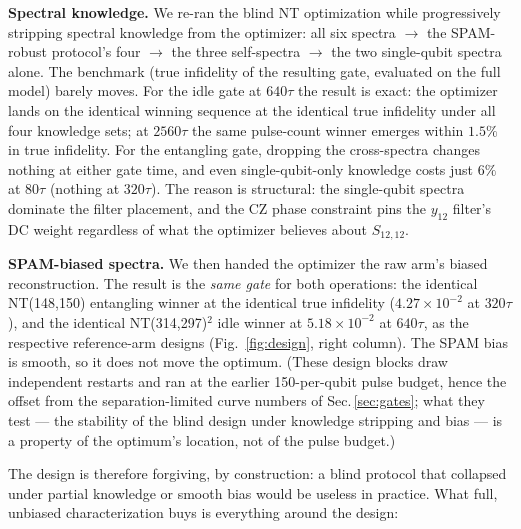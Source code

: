 \documentclass[10pt]{article}
\begin{document}
\textbf{Spectral knowledge.} We re-ran the blind NT optimization while
progressively stripping spectral knowledge from the optimizer: all six
spectra $\to$ the SPAM-robust protocol's four $\to$ the three self-spectra
$\to$ the two single-qubit spectra alone. The benchmark (true infidelity of
the resulting gate, evaluated on the full model) barely moves. For the idle
gate at $640\tau$ the result is exact: the optimizer lands on the identical
winning sequence at the identical true infidelity under all four knowledge
sets; at $2560\tau$ the same pulse-count winner emerges within $1.5\%$ in
true infidelity. For the entangling gate, dropping the cross-spectra changes
nothing at either gate time, and even single-qubit-only knowledge costs just
$6\%$ at $80\tau$ (nothing at $320\tau$). The reason is structural: the
single-qubit spectra dominate the filter placement, and the CZ phase
constraint pins the $y_{12}$ filter's DC weight regardless of what the
optimizer believes about $S_{12,12}$.

\textbf{SPAM-biased spectra.} We then handed the optimizer the raw arm's
biased reconstruction. The result is the \emph{same gate} for both
operations: the identical NT(148,150) entangling winner at the identical
true infidelity ($4.27\times10^{-2}$ at $320\tau$), and the identical
NT(314,297)$^2$ idle winner at $5.18\times10^{-2}$ at $640\tau$, as the
respective reference-arm designs (Fig.~\ref{fig:design}, right column). The
SPAM bias is smooth, so it does not move the optimum. (These design blocks
draw independent restarts and ran at the earlier 150-per-qubit pulse
budget, hence the offset from the separation-limited curve numbers of
Sec.\,\ref{sec:gates}; what they test --- the stability of the blind design
under knowledge stripping and bias --- is a property of the optimum's
location, not of the pulse budget.)

The design is therefore forgiving, by construction: a blind protocol that
collapsed under partial knowledge or smooth bias would be useless in
practice. What full, unbiased characterization buys is everything around the
design:
\end{document}
